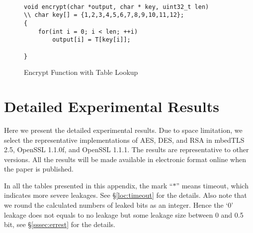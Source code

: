 ~

\begin{figure}[h!]
    \centering
    \begin{lstlisting}[xleftmargin=.02\textwidth,xrightmargin=.01\textwidth]
void encrypt(char *output, char * key, uint32_t len)
\\ char key[] = {1,2,3,4,5,6,7,8,9,10,11,12};
{
    for(int i = 0; i < len; ++i)
        output[i] = T[key[i]];

}
    \end{lstlisting}
    \caption{Encrypt Function with Table Lookup}
    \label{fig:table_lookup}
\end{figure}



\section{Detailed Experimental Results}
\label{sec:result-table}

Here we present the detailed experimental results.
Due to space limitation, we select the representative implementations of
AES, DES, and RSA in
mbedTLS 2.5,
OpenSSL 1.1.0f,  and
OpenSSL 1.1.1.  
The results are representative to other versions.
All the results will be made available in electronic format online
when the paper is published. %

In all the tables presented in this appendix, the mark ``$*$'' means timeout,
which indicates more severe leakages. See \S\ref{loc:timeout} for the details.
Also note that we round the calculated numbers of leaked bits as an integer.
Hence the `0' leakage does not equals to no leakage but some leakage size
between 0 and 0.5 bit, see \S\ref{sssec:errest} for the details.













